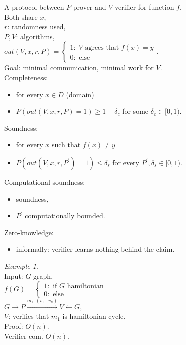 \documentclass[a4paper, 12pt]{book}
\theoremstyle{definition}
\theoremstyle{remark}
\newtheorem*{ex}{Example}
\begin{document}
A protocol between $P$ prover and $V$ verifier for function $f$. \\
Both share $x$, \\
$r$: randomness used, \\
$P, V$: algorithms, \\
$out(V, x, r, P) = \begin{cases}
  1: \; V \text{ agrees that } f(x) = y \\
  0: \text{ else}
\end{cases}$. \\
Goal: minimal communication, minimal work for $V$. \\
Completeness:
\begin{itemize}
  \item for every $x \in D$ (domain)
  \item $P(out(V, x, r, P) = 1) \geq 1 - \delta_c$ for some $\delta_c \in [0, 1)$.
\end{itemize}
Soundness:
\begin{itemize}
  \item for every $x$ such that $f(x) \neq y$
  \item $P(out(V, x, r, P^{'}) = 1) \leq \delta_s$ for every $P^{'}, \delta_s \in [0, 1)$.
\end{itemize}
Computational soundness:
\begin{itemize}
  \item soundness,
  \item $P^{'}$ computationally bounded.
\end{itemize}
Zero-knowledge:
\begin{itemize}
  \item informally: verifier learns nothing behind the claim.
\end{itemize}
\begin{ex} \text{} \\
  Input: $G$ graph, \\
  $f(G) = \begin{cases}
    1: \text{ if $G$ hamiltonian} \\
    0: \text{ else}
  \end{cases}$ \\
  $G \to P \stackrel{m_1: (v_1 \dots v_n)}{\longrightarrow} V \leftarrow G$, \\
  $V$: verifies that $m_1$ is hamiltonian cycle. \\
  Proof: $O(n)$. \\
  Verifier com. $O(n)$.
\end{ex}
\end{document}
